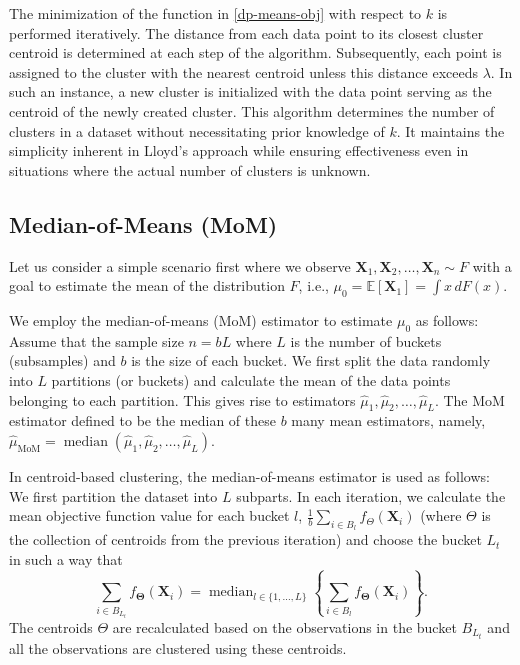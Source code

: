 \documentclass{article}
\newcommand{\bX}{\boldsymbol{X}}
\newcommand{\bTheta}{\boldsymbol{\Theta}}
\begin{document}
The minimization of the function in \eqref{dp-means-obj} with respect to $k$ is performed iteratively. The distance from each data point to its closest cluster centroid is determined at each step of the algorithm. Subsequently, each point is assigned to the cluster with the nearest centroid unless this distance exceeds $\lambda$. In such an instance, a new cluster is initialized with the data point serving as the centroid of the newly created cluster. This algorithm determines the number of clusters in a dataset without necessitating prior knowledge of $k$. It maintains the simplicity inherent in Lloyd's approach while ensuring effectiveness even in situations where the actual number of clusters is unknown.


\subsection{Median-of-Means (MoM)}

Let us consider a simple scenario first where we observe $\bX_1,\bX_2,\ldots,\bX_n\sim F$ with a goal to estimate the mean of the distribution $F$, i.e., $\mu_0=\mathbb{E} [\bX_1]=\int x\,dF(x)$.

We employ the median-of-means (MoM) estimator to estimate $\mu_0$ as follows: Assume that the sample size $n=bL$ where $L$ is the number of buckets (subsamples) and $b$ is the size of each bucket. We first split the data randomly into $L$ partitions (or buckets) and calculate the mean of the data points belonging to each partition. This gives rise to estimators $\hat{\mu}_1,\hat{\mu}_2,\ldots,\hat{\mu}_L$. The MoM estimator defined to be the median of these $b$ many mean estimators, namely, $\hat{\mu}_{\text{MoM}}=\operatorname{median} (\hat{\mu}_1,\hat{\mu}_2,\ldots,\hat{\mu}_L).$


In centroid-based clustering, the median-of-means estimator is used as follows: We first partition the dataset into $L$ subparts. In each iteration, we calculate the mean objective function value for each bucket $l$, $\frac{1}{b}\sum_{i \in B_{l}}f_{{\Theta}}(\bX_i)$ (where $\Theta$ is the collection of centroids from the previous iteration) and choose the bucket $L_t$ in such a way that
\begin{equation}\label{eq4}
    \sum_{i \in B_{L_t}}f_{{\bTheta}}(\bX_i)=\operatorname{median}_{l \in \{1,\ldots,L\}}\left\{\sum_{i \in B_{l}}f_{{\bTheta}}(\bX_i)\right\}.
\end{equation}
The centroids $\Theta$ are recalculated based on the observations in the bucket $B_{L_t}$ and all the observations are clustered using these centroids.
\end{document}
